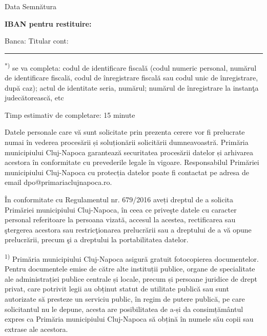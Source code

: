 \documentclass[11pt,a4paper]{article}
\newcommand{\fillline}[1][6cm]{\underline{\hspace{#1}}}
\newcommand{\fillbox}[1][0.4cm]{\framebox[#1]{\rule{0pt}{#1}}}
\begin{document}
\vspace{0.6cm}

Data \fillline[4cm] \hfill Semnătura \fillline[5cm]

\vspace{0.5cm}

\textbf{IBAN pentru restituire:}\\
\fillbox\fillbox\fillbox\fillbox\fillbox\fillbox\fillbox\fillbox\fillbox\fillbox\fillbox\fillbox\fillbox\fillbox\fillbox\fillbox\fillbox\fillbox\fillbox\fillbox\fillbox\fillbox\fillbox\fillbox

\vspace{0.3cm}

Banca: \fillline[8cm] \hfill Titular cont: \fillline[6cm]

\vspace{0.5cm}
\hrule
\vspace{0.2cm}

\footnotesize
\textsuperscript{*)} se va completa: codul de identificare fiscală (codul numeric personal, numărul de identificare fiscală, codul de înregistrare fiscală sau codul unic de înregistrare, după caz); actul de identitate seria, numărul; numărul de înregistrare la instanţa judecătorească, etc

\vspace{0.3cm}

Timp estimativ de completare: 15 minute

\vspace{0.2cm}

Datele personale care vă sunt solicitate prin prezenta cerere vor fi prelucrate numai în vederea procesării și soluționării solicitării dumneavoastră. Primăria municipiului Cluj-Napoca garantează securitatea procesării datelor și arhivarea acestora în conformitate cu prevederile legale în vigoare. Responsabilul Primăriei municipiului Cluj-Napoca cu protecția datelor poate fi contactat pe adresa de email dpo@primariaclujnapoca.ro.

În conformitate cu Regulamentul nr. 679/2016 aveți dreptul de a solicita Primăriei municipiului Cluj-Napoca, în ceea ce priveşte datele cu caracter personal referitoare la persoana vizată, accesul la acestea, rectificarea sau ştergerea acestora sau restricţionarea prelucrării sau a dreptului de a vă opune prelucrării, precum şi a dreptului la portabilitatea datelor.

\textsuperscript{1)} Primăria municipiului Cluj-Napoca asigură gratuit fotocopierea documentelor. Pentru documentele emise de către alte instituții publice, organe de specialitate ale administrației publice centrale și locale, precum și persoane juridice de drept privat, care potrivit legii au obținut statut de utilitate publică sau sunt autorizate să presteze un serviciu public, în regim de putere publică, pe care solicitantul nu le depune, acesta are posibilitatea de a-și da consimțământul expres ca Primăria municipiului Cluj-Napoca să obțină în numele său copii sau extrase ale acestora.
\end{document}
